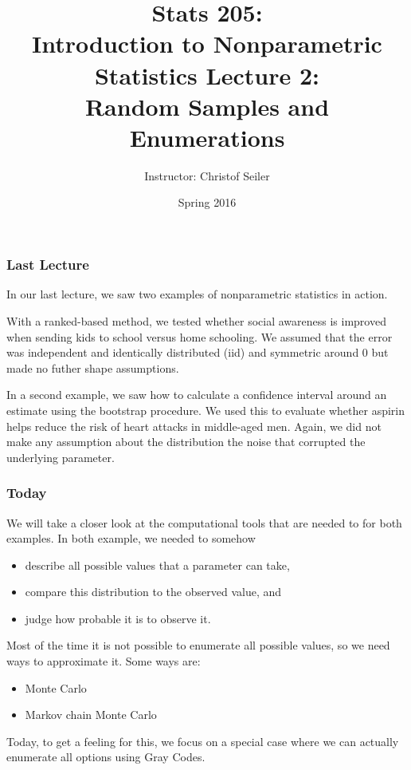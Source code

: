 \documentclass[10pt]{beamer}
\title{\large \bfseries Stats 205: \\ Introduction to Nonparametric Statistics \linebreak \linebreak \linebreak
Lecture 2: \\ Random Samples and Enumerations}
\author{Instructor: Christof Seiler}
\date{Spring 2016}
\begin{document}
\frame{
\thispagestyle{empty}
\titlepage
}

\begin{frame}
\frametitle{Last Lecture}

In our last lecture, we saw two examples of nonparametric statistics in action. \newline

With a ranked-based method, we tested whether social awareness is improved when sending kids to school versus home schooling.
We assumed that the error was independent and identically distributed (iid) and symmetric around $0$ but made no futher shape assumptions. \newline

In a second example, we saw how to calculate a confidence interval around an estimate using the bootstrap procedure. We used this to evaluate whether aspirin helps reduce the risk of heart attacks in middle-aged men. 
Again, we did not make any assumption about the distribution the noise that corrupted the underlying parameter. 

\end{frame}

\begin{frame}
\frametitle{Today}

We will take a closer look at the computational tools that are needed to for both examples. In both example, we needed to somehow 
\begin{itemize}
\item describe all possible values that a parameter can take, 
\item compare this distribution to the observed value, and 
\item judge how probable it is to observe it. 
\end{itemize}

\vspace{0.3cm}
Most of the time it is not possible to enumerate all possible values, so we need ways to approximate it. Some ways are:
\begin{itemize}
\item Monte Carlo
\item Markov chain Monte Carlo
\end{itemize}

\vspace{0.3cm}
Today, to get a feeling for this, we focus on a special case where we can actually enumerate all options using Gray Codes.

\end{frame}
\end{document}
